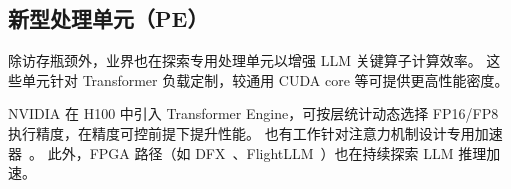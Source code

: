 \begin{table}[htbp!]
\centering
{}
\caption{新数据格式改进方向总结（通常以较小副作用换取收益）}
\end{table}

\subsection{新型处理单元（PE）}

除访存瓶颈外，业界也在探索专用处理单元以增强 LLM 关键算子计算效率。
这些单元针对 Transformer 负载定制，较通用 CUDA core 等可提供更高性能密度。

NVIDIA 在 H100 中引入 Transformer Engine，可按层统计动态选择 FP16/FP8 执行精度，在精度可控前提下提升性能。
也有工作针对注意力机制设计专用加速器~\citep{kao2023flat,qin2023fact}。
此外，FPGA 路径（如 DFX~\citep{hong2022dfx}、FlightLLM~\citep{zeng2024flightllm}）也在持续探索 LLM 推理加速。
